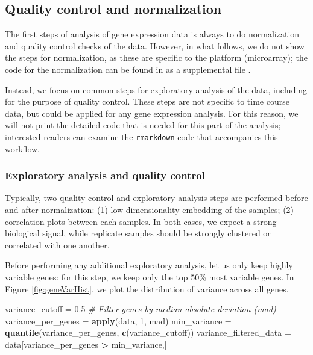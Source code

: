 \documentclass[9pt,a4paper,]{extarticle}
\newenvironment{Shaded}{\begin{snugshade}}{\end{snugshade}}
\newcommand{\CommentTok}[1]{\textcolor[rgb]{0.56,0.35,0.01}{\textit{#1}}}
\newcommand{\DecValTok}[1]{\textcolor[rgb]{0.00,0.00,0.81}{#1}}
\newcommand{\FloatTok}[1]{\textcolor[rgb]{0.00,0.00,0.81}{#1}}
\newcommand{\KeywordTok}[1]{\textcolor[rgb]{0.13,0.29,0.53}{\textbf{#1}}}
\newcommand{\NormalTok}[1]{#1}
\newcommand{\OperatorTok}[1]{\textcolor[rgb]{0.81,0.36,0.00}{\textbf{#1}}}
\newcommand{\StringTok}[1]{\textcolor[rgb]{0.31,0.60,0.02}{#1}}
\begin{document}
\hypertarget{quality-control-and-normalization}{%
\subsection{Quality control and normalization}\label{quality-control-and-normalization}}

The first steps of analysis of gene expression data is always to do
normalization and quality control checks of the data. However, in what
follows, we do not show the steps for normalization, as these are specific to
the platform (microarray); the code for the normalization can be found in as a
supplemental file \citep{abrams:protocol, park:evaluation}.

Instead, we focus on common steps for exploratory analysis of the data, including for the purpose of quality control. These steps
are not specific to time course data, but could be applied for any gene expression
analysis. For this reason, we will not print the detailed code that is needed for this part of the analysis; interested readers can examine the \texttt{rmarkdown} code that accompanies this workflow.

\hypertarget{exploratory-analysis-and-quality-control}{%
\subsubsection{Exploratory analysis and quality control}\label{exploratory-analysis-and-quality-control}}

Typically, two quality control and exploratory analysis steps are
performed before and after normalization: (1) low dimensionality embedding of
the samples; (2) correlation plots between each samples. In both cases, we
expect a strong biological signal, while replicate samples should be strongly
clustered or correlated with one another.

Before performing any additional exploratory analysis, let us only keep highly
variable genes: for this step, we keep only the top 50\% most variable genes.
In Figure \ref{fig:geneVarHist}, we plot the distribution of variance across
all genes.

\begin{Shaded}
\begin{Highlighting}[]
\NormalTok{variance_cutoff =}\StringTok{ }\FloatTok{0.5}
\CommentTok{# Filter genes by median absolute deviation (mad)}
\NormalTok{variance_per_genes =}\StringTok{ }\KeywordTok{apply}\NormalTok{(data, }\DecValTok{1}\NormalTok{, mad)}
\NormalTok{min_variance =}\StringTok{ }\KeywordTok{quantile}\NormalTok{(variance_per_genes, }\KeywordTok{c}\NormalTok{(variance_cutoff))}
\NormalTok{variance_filtered_data =}\StringTok{ }\NormalTok{data[variance_per_genes }\OperatorTok{>}\StringTok{ }\NormalTok{min_variance,]}
\end{Highlighting}
\end{Shaded}
\end{document}
